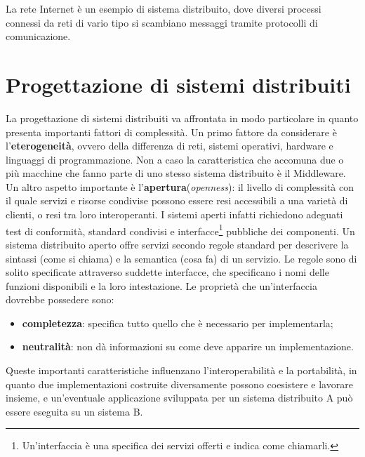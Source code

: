 La rete Internet è un esempio di sistema distribuito, dove diversi processi connessi da reti di vario tipo si scambiano messaggi tramite protocolli di comunicazione. 
\section{Progettazione di sistemi distribuiti}
La progettazione di sistemi distribuiti va affrontata in modo particolare in quanto presenta importanti fattori di complessità. Un primo fattore da considerare è l'\textbf{eterogeneità}, ovvero della differenza di reti, sistemi operativi, hardware e linguaggi di programmazione. Non a caso la caratteristica che accomuna due o più macchine che fanno parte di uno stesso sistema distribuito è il Middleware. Un altro aspetto importante è l'\textbf{apertura}(\textit{openness}): il livello di complessità con il quale servizi e risorse condivise possono essere resi accessibili a una varietà di clienti, o resi tra loro interoperanti.
I sistemi aperti infatti richiedono adeguati test di conformità, standard condivisi e interfacce\footnote{Un'interfaccia è una specifica dei servizi offerti e indica come chiamarli.} pubbliche dei componenti. Un sistema distribuito aperto offre servizi secondo regole standard per descrivere la sintassi (come si chiama) e la semantica (cosa fa) di un servizio. Le regole sono di solito specificate attraverso suddette interfacce, che specificano i nomi delle funzioni disponibili e la loro intestazione.
Le proprietà che un'interfaccia dovrebbe possedere sono:
\begin{itemize}
    \item \textbf{completezza}: specifica tutto quello che è necessario per implementarla;
    \item \textbf{neutralità}: non dà informazioni su come deve apparire un implementazione.
\end{itemize}
Queste importanti caratteristiche influenzano l'interoperabilità e la portabilità, in quanto due implementazioni costruite diversamente possono coesistere e lavorare insieme, e un'eventuale applicazione sviluppata per un sistema distribuito A può essere eseguita su un sistema B.

\vspace{5mm}

